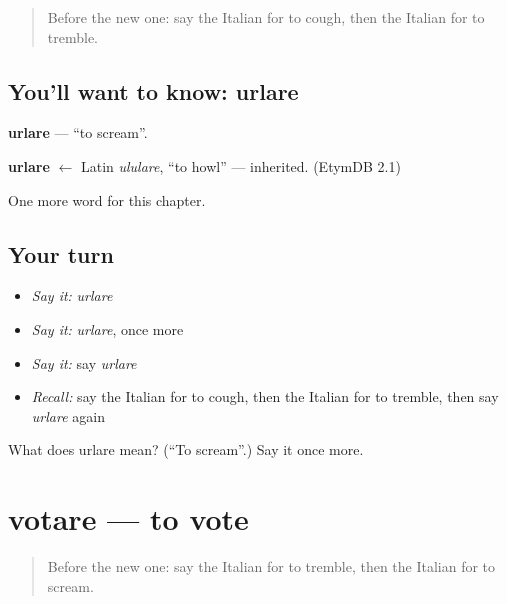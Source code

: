 \label{lesson:IT-C214-urlare}



\begin{quote}
Before the new one: say the Italian for to cough, then the Italian for to tremble.
\end{quote}

\subsection*{You'll want to know: urlare}
\textbf{urlare} — \textquotedblleft{}to scream\textquotedblright{}.

\begin{cousinweb}
\textbf{urlare} $\leftarrow$ Latin \emph{ululare}, \textquotedblleft{}to howl\textquotedblright{} — inherited. (EtymDB 2.1)
\end{cousinweb}

\begin{grammarlens}[title={What you've built}]
One more word for this chapter.
\end{grammarlens}

\subsection*{Your turn}
\begin{itemize}
\raggedright
  \item \emph{Say it:} \emph{urlare}
  \item \emph{Say it:} \emph{urlare}, once more
  \item \emph{Say it:} say \emph{urlare}
  \item \emph{Recall:} say the Italian for to cough, then the Italian for to tremble, then say \emph{urlare} again
\end{itemize}

\begin{tcolorbox}[breakable,colback=teal!4,colframe=teal!35!black,title={Before you move on}]
What does urlare mean? (\textquotedblleft{}To scream\textquotedblright{}.) Say it once more.
\end{tcolorbox}
\section[votare]{votare — to vote}

\label{lesson:IT-C214-votare}



\begin{quote}
Before the new one: say the Italian for to tremble, then the Italian for to scream.
\end{quote}

